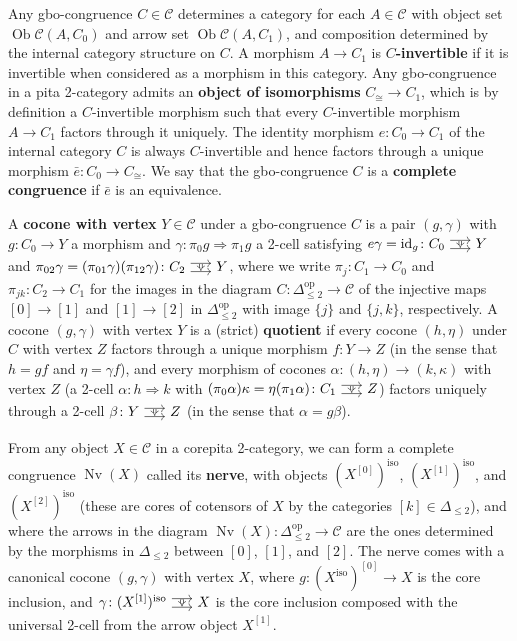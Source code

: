 \documentclass{amsart}
\newcommand\cC{\mathcal{C}}
\newcommand\defword[1]{{\boldmath \textbf{#1}}}
\newcommand\id{\mathrm{id}}
\newcommand\iso{\mathrm{iso}}
\newcommand\Nv{\operatorname{Nv}}
\newcommand\Ob{\operatorname{Ob}}
\newcommand\op{\mathrm{op}}
\newcommand\set[2][]{#1\{ #2 #1\}}
\newcommand\tocell{\hspace{-5pt}\begin{tikzcd}[column sep=15pt, ampersand replacement=\&]{}\ar[r, shift left=3pt, ""{name=top}]\ar[r, shift right=3pt, ""'{name=bot}, start anchor=east, end anchor=west]\&{}\ar[Rightarrow, from=top, to=bot, shorten=0.5pt]\end{tikzcd}\hspace{-5pt}}
\newcommand\To{\Rightarrow}
\theoremstyle{definition}
\theoremstyle{remark}
\theoremstyle{plainwithref}
\begin{document}
Any gbo-congruence \( C \in \cC \) determines a category for each \( A \in \cC \) with object set \( \Ob \cC(A, C_0) \) and arrow set \( \Ob \cC(A, C_1) \), and composition determined by the internal category structure on \( C \).
A morphism \( A \to C_1 \) is \defword{\( C \)-invertible} if it is invertible when considered as a morphism in this category.
Any gbo-congruence in a pita 2-category admits an \defword{object of isomorphisms} \( C_{\cong} \to C_1 \), which is by definition a \( C \)-invertible morphism such that every \( C \)-invertible morphism \( A \to C_1 \) factors through it uniquely.
The identity morphism \( e \colon C_0 \to C_1 \) of the internal category \( C \) is always \( C \)-invertible and hence factors through a unique morphism \( \bar e \colon C_0 \to C_{\cong} \).
We say that the gbo-congruence \( C \) is a \defword{complete congruence} if \( \bar e \) is an equivalence.

A \defword{cocone with vertex} \( Y \in \cC \) under a gbo-congruence \( C \) is a pair \( (g, \gamma) \) with \( g \colon C_0 \to Y \) a morphism and \( \gamma \colon \pi_0 g \To \pi_1 g \) a 2-cell satisfying \( e \gamma = \id_g \colon C_0 \tocell Y \) and \( \pi_{02} \gamma = (\pi_{01} \gamma) (\pi_{12} \gamma) \colon C_2 \tocell Y \), where we write \( \pi_j \colon C_1 \to C_0 \) and \( \pi_{j k} \colon C_2 \to C_1 \) for the images in the diagram \( C \colon \Delta_{\le 2}^\op \to \cC \) of the injective maps \( [0] \to [1] \) and \( [1] \to [2] \) in \( \Delta_{\le 2}^\op \) with image \( \set{j} \) and \( \set{j,k} \), respectively.
A cocone \( (g, \gamma) \) with vertex \( Y \) is a (strict) \defword{quotient} if every cocone \( (h, \eta) \) under \( C \) with vertex \( Z \) factors through a unique morphism \( f \colon Y \to Z \) (in the sense that \( h = g f \) and \( \eta = \gamma f \)), and every morphism of cocones \( \alpha \colon (h, \eta) \to (k, \kappa) \) with vertex \( Z \) (a 2-cell \( \alpha \colon h \To k \) with \( (\pi_0 \alpha) \kappa = \eta (\pi_1 \alpha) \colon C_1 \tocell Z \)) factors uniquely through a 2-cell \( \beta \colon Y \tocell Z \) (in the sense that \( \alpha = g \beta \)).

From any object \( X \in \cC \) in a corepita 2-category, we can form a complete congruence \( \Nv(X) \) called its \defword{nerve}, with objects \( (X^{[0]})^\iso \), \( (X^{[1]})^\iso \), and \( (X^{[2]})^\iso \) (these are cores of cotensors of \( X \) by the categories \( [k] \in \Delta_{\le 2} \)), and where the arrows in the diagram \( \Nv(X) \colon \Delta_{\le 2}^\op \to \cC \) are the ones determined by the morphisms in \( \Delta_{\le 2} \) between \( [0] \), \( [1] \), and \( [2] \).
The nerve comes with a canonical cocone \( (g, \gamma) \) with vertex \( X \), where \( g \colon (X^\iso)^{[0]} \to X \) is the core inclusion, and \( \gamma \colon (X^{[1]})^\iso \tocell X \) is the core inclusion composed with the universal 2-cell from the arrow object \( X^{[1]} \).
\end{document}
